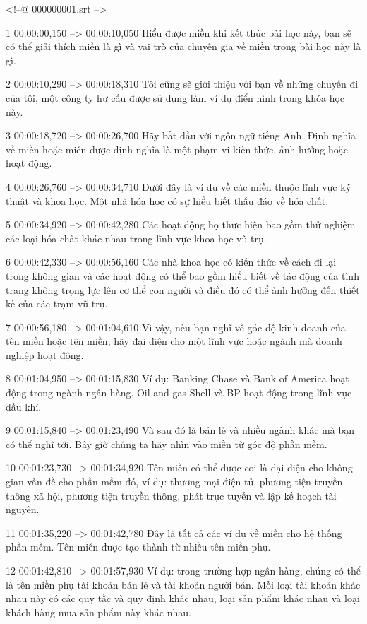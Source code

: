 <!--@ 000000001.srt -->

1
00:00:00,150 --> 00:00:10,050
Hiểu được miền khi kết thúc bài học này, bạn sẽ có thể giải thích miền là gì và vai trò của chuyên gia về miền trong bài học này là gì.

2
00:00:10,290 --> 00:00:18,310
Tôi cũng sẽ giới thiệu với bạn về những chuyến đi của tôi, một công ty hư cấu được sử dụng làm ví dụ điển hình trong khóa học này.

3
00:00:18,720 --> 00:00:26,700
Hãy bắt đầu với ngôn ngữ tiếng Anh.  Định nghĩa về miền hoặc miền được định nghĩa là một phạm vi kiến ​​thức, ảnh hưởng hoặc hoạt động.

4
00:00:26,760 --> 00:00:34,710
Dưới đây là ví dụ về các miền thuộc lĩnh vực kỹ thuật và khoa học.  Một nhà hóa học có sự hiểu biết thấu đáo về hóa chất.

5
00:00:34,920 --> 00:00:42,280
Các hoạt động họ thực hiện bao gồm thử nghiệm các loại hóa chất khác nhau trong lĩnh vực khoa học vũ trụ.

6
00:00:42,330 --> 00:00:56,160
Các nhà khoa học có kiến ​​thức về cách đi lại trong không gian và các hoạt động có thể bao gồm hiểu biết về tác động của tình trạng không trọng lực lên cơ thể con người và điều đó có thể ảnh hưởng đến thiết kế của các trạm vũ trụ.

7
00:00:56,180 --> 00:01:04,610
Vì vậy, nếu bạn nghĩ về góc độ kinh doanh của tên miền hoặc tên miền, hãy đại diện cho một lĩnh vực hoặc ngành mà doanh nghiệp hoạt động.

8
00:01:04,950 --> 00:01:15,830
Ví dụ: Banking Chase và Bank of America hoạt động trong ngành ngân hàng.  Oil and gas Shell và BP hoạt động trong lĩnh vực dầu khí.

9
00:01:15,840 --> 00:01:23,490
Và sau đó là bán lẻ và nhiều ngành khác mà bạn có thể nghĩ tới.  Bây giờ chúng ta hãy nhìn vào miền từ góc độ phần mềm.

10
00:01:23,730 --> 00:01:34,920
Tên miền có thể được coi là đại diện cho không gian vấn đề cho phần mềm đó, ví dụ: thương mại điện tử, phương tiện truyền thông xã hội, phương tiện truyền thông, phát trực tuyến và lập kế hoạch tài nguyên.

11
00:01:35,220 --> 00:01:42,780
Đây là tất cả các ví dụ về miền cho hệ thống phần mềm.  Tên miền được tạo thành từ nhiều tên miền phụ.

12
00:01:42,810 --> 00:01:57,930
Ví dụ: trong trường hợp ngân hàng, chúng có thể là tên miền phụ tài khoản bán lẻ và tài khoản người bán.  Mỗi loại tài khoản khác nhau này có các quy tắc và quy định khác nhau, loại sản phẩm khác nhau và loại khách hàng mua sản phẩm này khác nhau.

